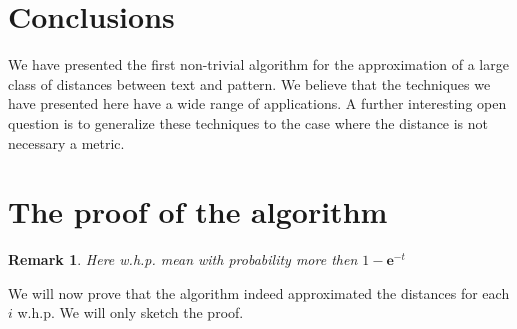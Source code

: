 \documentclass[11pt]{article}
\newtheorem{rem}[thm]{Remark}
\newcommand{\bfe}{\textbf{e}}
\begin{document}
\section{Conclusions}
We have presented the first non-trivial algorithm for the
approximation of a large class of distances between text and
pattern. We believe that the techniques we have presented here have a wide
range of applications. A further interesting open question is to
generalize these techniques to the case where the distance is not necessary a metric.




\begin{small}

\end{small}
\appendix
\section{The proof of the algorithm}
\begin{rem}
Here w.h.p. mean with probability more then $1-\bfe^{-t}$
\end{rem}
We will now prove that the algorithm indeed approximated the
distances for each $i$ w.h.p. We will only sketch
the proof.
\end{document}
